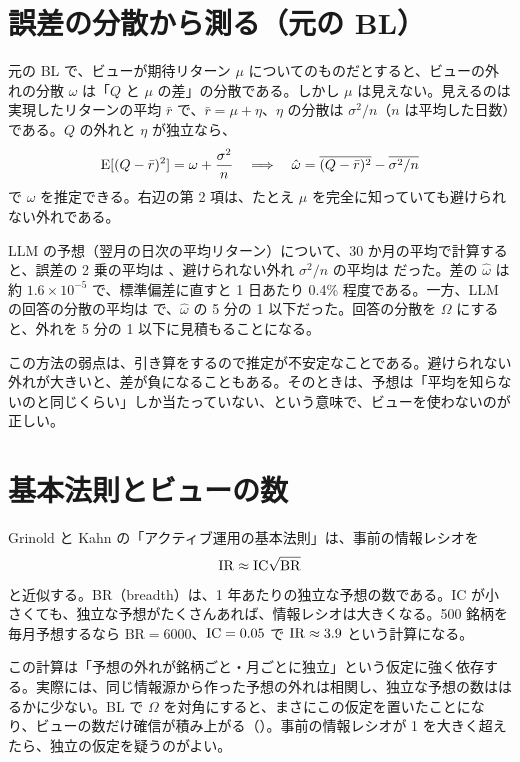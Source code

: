 \section{誤差の分散から測る（元の BL）}

元の BL で、ビューが期待リターン $\mu$ についてのものだとすると、ビューの外れの分散 $\omega$ は「$Q$ と $\mu$ の差」の分散である。しかし $\mu$ は見えない。見えるのは実現したリターンの平均 $\bar r$ で、$\bar r=\mu+\eta$、$\eta$ の分散は $\sigma^2/n$（$n$ は平均した日数）である。$Q$ の外れと $\eta$ が独立なら、
\begin{equation}
\mathrm{E}[(Q-\bar r)^2]=\omega+\frac{\sigma^2}{n}
\quad\Longrightarrow\quad
\hat\omega=\overline{(Q-\bar r)^2}-\overline{\sigma^2/n}
\label{eq:omega-err}
\end{equation}
で $\omega$ を推定できる。右辺の第 2 項は、たとえ $\mu$ を完全に知っていても避けられない外れである。

\begin{exbox}[本プロジェクトのデータ]
LLM の予想（翌月の日次の平均リターン）について、30 か月の平均で計算すると、誤差の 2 乗の平均は 、避けられない外れ $\sigma^2/n$ の平均は  だった。差の $\hat\omega$ は約 $1.6\times10^{-5}$ で、標準偏差に直すと 1 日あたり 0.4\% 程度である。一方、LLM の回答の分散の平均は  で、$\hat\omega$ の 5 分の 1 以下だった。回答の分散を $\Omega$ にすると、外れを 5 分の 1 以下に見積もることになる。
\end{exbox}

この方法の弱点は、引き算をするので推定が不安定なことである。避けられない外れが大きいと、差が負になることもある。そのときは、予想は「平均を知らないのと同じくらい」しか当たっていない、という意味で、ビューを使わないのが正しい。

\section{基本法則とビューの数}

Grinold と Kahn の「アクティブ運用の基本法則」は、事前の情報レシオを
\begin{equation}
\mathrm{IR}\approx\mathrm{IC}\sqrt{\mathrm{BR}}
\end{equation}
と近似する。BR（breadth）は、1 年あたりの独立な予想の数である。IC が小さくても、独立な予想がたくさんあれば、情報レシオは大きくなる。500 銘柄を毎月予想するなら $\mathrm{BR}=6000$、$\mathrm{IC}=0.05$ で $\mathrm{IR}\approx3.9$ という計算になる。

この計算は「予想の外れが銘柄ごと・月ごとに独立」という仮定に強く依存する。実際には、同じ情報源から作った予想の外れは相関し、独立な予想の数ははるかに少ない。BL で $\Omega$ を対角にすると、まさにこの仮定を置いたことになり、ビューの数だけ確信が積み上がる（）。事前の情報レシオが 1 を大きく超えたら、独立の仮定を疑うのがよい。

